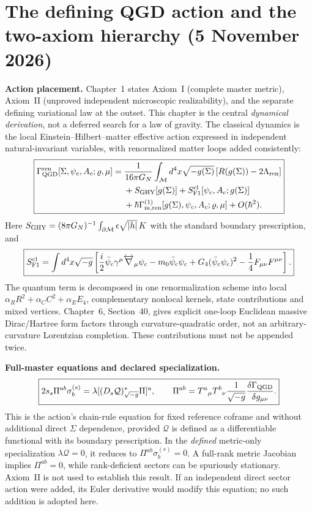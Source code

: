 \documentclass[11pt,a4paper]{article}
\begin{document}
\section*{The defining QGD action and the two-axiom hierarchy (5 November 2026)}
\noindent\textbf{Action placement.} Chapter~1 states Axiom~I (complete master metric), Axiom~II (unproved independent microscopic realizability), and the separate defining variational law at the outset. This chapter is the central \emph{dynamical derivation}, not a deferred search for a law of gravity. The classical dynamics is the local Einstein--Hilbert--matter effective action expressed in independent natural-invariant variables, with renormalized matter loops added consistently:
\begin{equation}\label{eq:qgd-action-first-2026}
\boxed{\begin{aligned}
\Gamma_{\rm QGD}^{\rm ren}[\Sigma,\psi_c,A_c;\varrho,\mu]
={}&\frac{1}{16\pi G_N}\int_\mathcal M d^4x\sqrt{-g(\Sigma)}\,[R(g(\Sigma))-2\Lambda_{\rm ren}]\\
&+S_{\rm GHY}[g(\Sigma)]+S_{\rm F1}^{\rm cl}[\psi_c,A_c;g(\Sigma)]\\
&+\hbar\Gamma_{\rm m,ren}^{(1)}[g(\Sigma),\psi_c,A_c;\varrho,\mu]+O(\hbar^2).
\end{aligned}}
\end{equation}
Here $S_{\rm GHY}=(8\pi G_N)^{-1}\int_{\partial\mathcal M}\epsilon\sqrt{|h|}\,K$ with the standard boundary prescription, and
\begin{equation}
\boxed{S_{\rm F1}^{\rm cl}=\int d^4x\sqrt{-g}\left[\frac i2\bar\psi_c\gamma^\mu\overleftrightarrow\nabla_\mu\psi_c-m_0\bar\psi_c\psi_c+G_4(\bar\psi_c\psi_c)^2-\frac14F_{\mu\nu}F^{\mu\nu}\right].}
\end{equation}
The quantum term is decomposed in one renormalization scheme into local $\alpha_R R^2+\alpha_C C^2+\alpha_E E_4$, complementary nonlocal kernels, state contributions and mixed vertices. Chapter~6, Section~40, gives explicit one-loop Euclidean massive Dirac/Hartree form factors through curvature-quadratic order, not an arbitrary-curvature Lorentzian completion. These contributions must not be appended twice.

\noindent\textbf{Full-master equations and declared specialization.}
\begin{equation}\label{eq:qgd-optionC-first-2026}
\boxed{2s_s\Pi^{ab}\sigma_b^{(s)}=\lambda[(D_s\mathcal Q)^*_{\sqrt{-g}}\Pi]^a,\qquad
\Pi^{ab}=T^a{}_{\mu}T^b{}_{\nu}\frac1{\sqrt{-g}}\frac{\delta\Gamma_{\rm QGD}}{\delta g_{\mu\nu}}.}
\end{equation}
This is the action's chain-rule equation for fixed reference coframe and without additional direct $\Sigma$ dependence, provided $\mathcal Q$ is defined as a differentiable functional with its boundary prescription. In the \emph{defined} metric-only specialization $\lambda\mathcal Q=0$, it reduces to $\Pi^{ab}\sigma_b^{(s)}=0$. A full-rank metric Jacobian implies $\Pi^{ab}=0$, while rank-deficient sectors can be spuriously stationary. Axiom~II is not used to establish this result. If an independent direct sector action were added, its Euler derivative would modify this equation; no such addition is adopted here.
\end{document}

